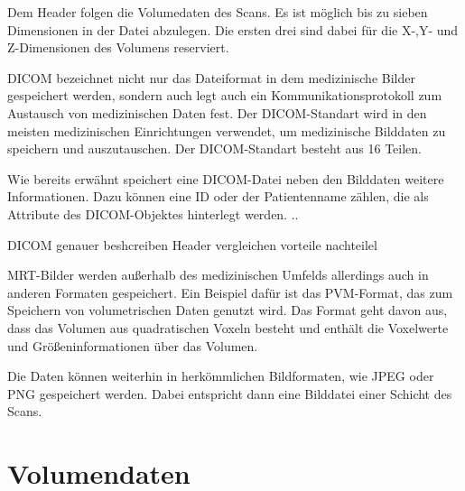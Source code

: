 Dem Header folgen die Volumedaten des Scans. Es ist möglich bis zu sieben Dimensionen in der Datei abzulegen. Die ersten drei sind dabei für die X-,Y- und Z-Dimensionen des Volumens reserviert.

DICOM bezeichnet nicht nur das Dateiformat in dem medizinische Bilder gespeichert werden, sondern auch legt auch ein Kommunikationsprotokoll zum Austausch von medizinischen Daten fest. Der DICOM-Standart wird in den meisten medizinischen Einrichtungen verwendet, um medizinische Bilddaten zu speichern und auszutauschen.
Der DICOM-Standart besteht aus 16 Teilen.

Wie bereits erwähnt speichert eine DICOM-Datei neben den Bilddaten weitere Informationen. Dazu können eine ID oder der Patientenname zählen, die als Attribute des DICOM-Objektes hinterlegt werden. 
..

DICOM genauer beshcreiben
Header vergleichen
vorteile nachteilel

MRT-Bilder werden außerhalb des medizinischen Umfelds allerdings auch in anderen Formaten gespeichert. 
Ein Beispiel dafür ist das PVM-Format, das zum Speichern von volumetrischen Daten genutzt wird. Das Format geht davon aus, dass das Volumen aus quadratischen Voxeln besteht und enthält die Voxelwerte und Größeninformationen über das Volumen.

Die Daten können weiterhin in herkömmlichen Bildformaten, wie JPEG oder PNG gespeichert werden. Dabei entspricht dann eine Bilddatei einer Schicht des Scans. 
 

\section{Volumendaten}							  	  %

